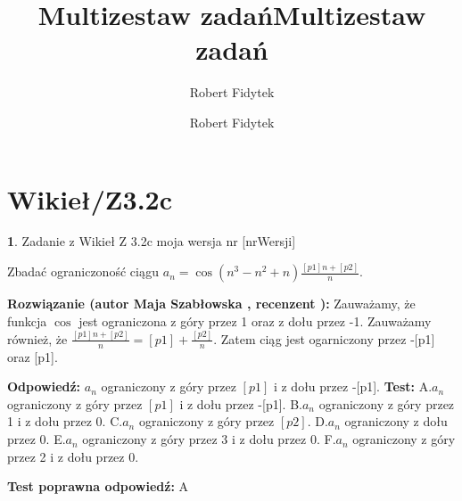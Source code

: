 \documentclass[12pt, a4paper]{article}
\title{Multizestaw zadań}
\author{Robert Fidytek}
\date{}\documentclass[12pt, a4paper]{article}
\title{Multizestaw zadań}
\author{Robert Fidytek}
\date{}
\theoremstyle{definition} %
\newtheorem{zad}{}
\theoremstyle{definition} %
\newtheorem{zad}{}
\newcommand{\kategoria}[1]{\section{#1}} %
\newcommand{\zadStart}[1]{\begin{zad}#1\newline} %
\newcommand{\zadStop}{\end{zad}}   %
\newcommand{\rozwStart}[2]{\noindent \textbf{Rozwiązanie (autor #1 , recenzent #2): }\newline} %
\newcommand{\rozwStop}{\newline}                                            %
\newcommand{\odpStart}{\noindent \textbf{Odpowiedź:}\newline}    %
\newcommand{\odpStop}{\newline}                                             %
\newcommand{\testStart}{\noindent \textbf{Test:}\newline} %
\newcommand{\testStop}{\newline} %
\newcommand{\kluczStart}{\noindent \textbf{Test poprawna odpowiedź:}\newline} %
\newcommand{\kluczStop}{\newline} %
\begin{document}
\maketitle


\kategoria{Wikieł/Z3.2c}
\zadStart{Zadanie z Wikieł Z 3.2c moja wersja nr [nrWersji]}


Zbadać ograniczoność ciągu $a_{n}=\cos(n^{3}-n^{2}+n)\frac{[p1]n+[p2]}{n}$.

\zadStop

\rozwStart{Maja Szabłowska}{}
Zauważamy, że funkcja $\cos$ jest ograniczona z góry przez 1 oraz z dołu przez -1. 
Zauważamy również, że $\frac{[p1]n+[p2]}{n}=[p1]+\frac{[p2]}{n}.$ Zatem ciąg jest ogarniczony przez -[p1] oraz [p1].

\rozwStop


\odpStart
$a_{n}$ ograniczony z góry przez $[p1]$ i z dołu przez -[p1].
\odpStop
\testStart
A.$a_{n}$ ograniczony z góry przez $[p1]$ i z dołu przez -[p1].
B.$a_{n}$ ograniczony z góry przez 1 i z dołu przez 0.
C.$a_{n}$ ograniczony z góry przez $[p2]$.
D.$a_{n}$ ograniczony z dołu przez 0.
E.$a_{n}$ ograniczony z góry przez 3 i z dołu przez 0.
F.$a_{n}$ ograniczony z góry przez 2 i z dołu przez 0.


\testStop
\kluczStart
A
\kluczStop
\end{document}
